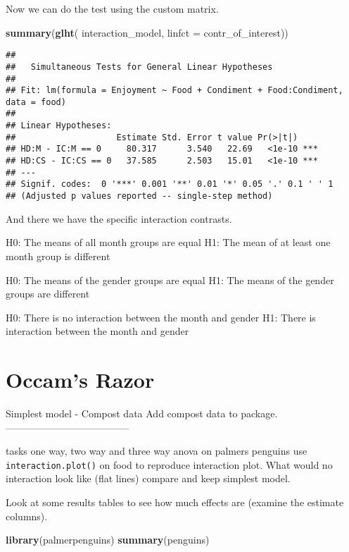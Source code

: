 \documentclass[]{book}
\newenvironment{Shaded}{\begin{snugshade}}{\end{snugshade}}
\newcommand{\DataTypeTok}[1]{\textcolor[rgb]{0.13,0.29,0.53}{#1}}
\newcommand{\KeywordTok}[1]{\textcolor[rgb]{0.13,0.29,0.53}{\textbf{#1}}}
\newcommand{\NormalTok}[1]{#1}
\begin{document}
Now we can do the test using the custom matrix.

\begin{Shaded}
\begin{Highlighting}[]
\KeywordTok{summary}\NormalTok{(}\KeywordTok{glht}\NormalTok{( interaction_model, }\DataTypeTok{linfct =}\NormalTok{ contr_of_interest))}
\end{Highlighting}
\end{Shaded}

\begin{verbatim}
## 
##   Simultaneous Tests for General Linear Hypotheses
## 
## Fit: lm(formula = Enjoyment ~ Food + Condiment + Food:Condiment, data = food)
## 
## Linear Hypotheses:
##                    Estimate Std. Error t value Pr(>|t|)    
## HD:M - IC:M == 0     80.317      3.540   22.69   <1e-10 ***
## HD:CS - IC:CS == 0   37.585      2.503   15.01   <1e-10 ***
## ---
## Signif. codes:  0 '***' 0.001 '**' 0.01 '*' 0.05 '.' 0.1 ' ' 1
## (Adjusted p values reported -- single-step method)
\end{verbatim}

And there we have the specific interaction contrasts.

H0: The means of all month groups are equal
H1: The mean of at least one month group is different

H0: The means of the gender groups are equal
H1: The means of the gender groups are different

H0: There is no interaction between the month and gender
H1: There is interaction between the month and gender

\hypertarget{occams-razor}{%
\section{Occam's Razor}\label{occams-razor}}

Simplest model - Compost data
Add compost data to package.
--------------------------------------

tasks one way, two way and three way anova on palmers penguins
use \texttt{interaction.plot()} on food to reproduce interaction plot. What would no interaction look like (flat lines)
compare and keep simplest model.

Look at some results tables to see how much effects are (examine the estimate columns).

\begin{Shaded}
\begin{Highlighting}[]
\KeywordTok{library}\NormalTok{(palmerpenguins)}
\KeywordTok{summary}\NormalTok{(penguins)}
\end{Highlighting}
\end{Shaded}
\end{document}
